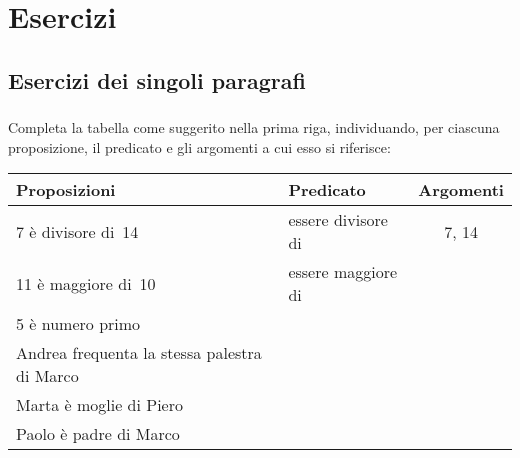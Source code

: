 
\section{Esercizi}
\subsection{Esercizi dei singoli paragrafi}
\subsubsection*{}

\begin{esercizio}
\label{ese:B.1}
Completa la tabella come suggerito nella prima riga, individuando, per 
ciascuna proposizione, il predicato e gli argomenti a cui esso si riferisce:
\begin{center}
\begin{tabular}{llc}
\toprule
Proposizioni & Predicato & Argomenti\\
\midrule
7 è divisore di~14 & essere divisore di & 7, 14 \\
11 è maggiore di~10 & essere maggiore di & \\
5 è numero primo & & \\
Andrea frequenta la stessa palestra di Marco & & \\
Marta è moglie di Piero & & \\
Paolo è padre di Marco & & \\
\bottomrule
\end{tabular}
\end{center}
\end{esercizio}

